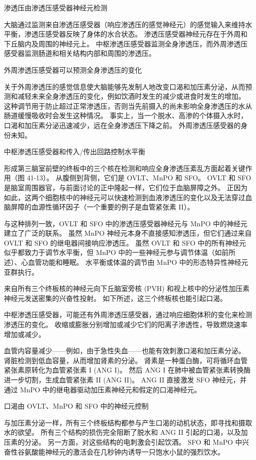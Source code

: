 渗透压由渗透压感受器神经元检测

大脑通过监测来自渗透压感受器（响应渗透压的感觉神经元）的感觉输入来维持水平衡，渗透压感受器反映了身体的水合状态。 渗透压感受器神经元存在于外周和下丘脑内及周围的神经元上。 中枢渗透压感受器监测全身渗透压，而外周渗透压感受器监测肠道和相关结构内部和周围的渗透压。

外周渗透压感受器可以预测全身渗透压的变化

关于外周渗透压的感觉信息使大脑能够先发制人地改变口渴和加压素分泌，从而预测和减轻未来全身渗透压的变化，例如饮酒时发生的减少或进食时发生的增加。 这种调节用于防止超过正常渗透压，否则当先前摄入的尚未影响全身渗透压的水从肠道缓慢吸收时会发生这种情况。 事实上，当一个脱水、高渗的个体摄入水时，口渴和加压素分泌迅速减少，远在全身渗透压下降之前。 外周渗透压感受器的身份未知。

中枢渗透压感受器和传入/传出回路控制水平衡

形成第三脑室前壁的终板中的三个核在检测和响应全身渗透压紊乱方面起着关键作用（图 41-13）。 从腹侧到背侧，它们是 OVLT、MnPO 和 SFO。 OVLT 和 SFO 是脑室周围器官，与前面讨论的正中隆起一样，它们位于血脑屏障之外。 正因为如此，这两个细胞核中的神经元可以快速检测到血液渗透压的变化以及无法穿过血脑屏障的血源性循环因子（一个重要的例子是血管紧张素 II）。

与这种排列一致，OVLT 和 SFO 中的渗透压感受器神经元与 MnPO 中的神经元建立了广泛的联系。 虽然 MnPO 神经元本身不直接感知渗透压，但它们通过来自 OVLT 和 SFO 的继电器间接响应渗透压。 虽然 OVLT 和 SFO 中的所有神经元似乎都致力于调节水平衡，但 MnPO 中的一些神经元参与调节体温（如前所述）、心血管功能和睡眠。 水平衡或体温的调节由 MnPO 中的形态特异性神经元亚群执行。

来自所有三个终板核的神经元向下丘脑室旁核 (PVH) 和视上核中的分泌性加压素神经元发送密集的兴奋性投射。 如下所述，这三个终板核也能引起口渴。

中枢渗透压感受器，可能还有外周渗透压感受器，通过响应细胞体积的变化来检测渗透压的变化。 收缩或膨胀分别增加或减少它们的阳离子渗透性，导致燃烧速率增加或减少。

血管内容量减少——例如，由于急性失血——也能有效刺激口渴和加压素分泌。 肾脏检测到低血容量，从而增加肾素的分泌。 肾素是一种蛋白酶，可将循环血管紧张素原转化为血管紧张素 I (ANG I)。 然后 ANG I 在肺中被血管紧张素转换酶进一步切割，生成血管紧张素 II (ANG II)。 ANG II 直接激发 SFO 神经元，并通过 MnPO 中的继电器驱动加压素神经元和假定的口渴神经元。

口渴由 OVLT、MnPO 和 SFO 中的神经元控制

与加压素分泌一样，所有三个终板结构都参与产生口渴的动机状态，即寻找和摄取水的欲望。 所有三个结构的损伤完全阻断了脱水和 ANG II 引起的口渴，以及加压素的分泌。 另一方面，对这些结构的电刺激会引起饮酒。 SFO 和 MnPO 中兴奋性谷氨酸能神经元的激活会在几秒钟内诱导一只饱水小鼠的强烈饮水。

